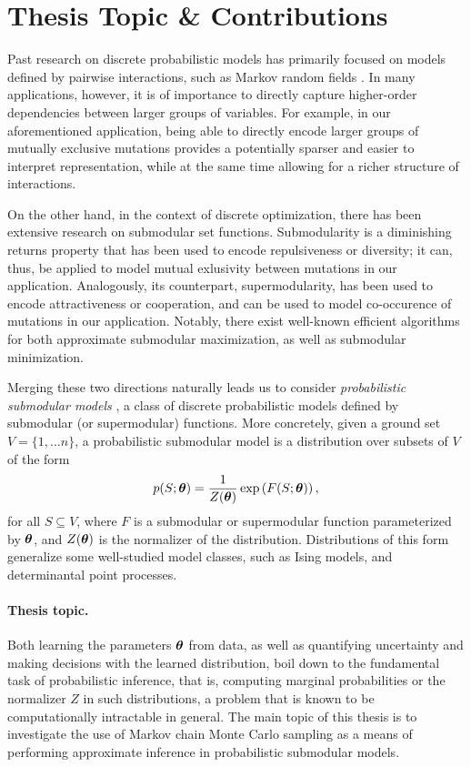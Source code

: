 \section{Thesis Topic \& Contributions}
Past research on discrete probabilistic models has primarily focused on models defined by pairwise interactions, such as Markov random fields \cite{koller09}.
In many applications, however, it is of importance to directly capture higher-order dependencies between larger groups of variables.
For example, in our aforementioned application, being able to directly encode larger groups of mutually exclusive mutations provides a potentially sparser and easier to interpret representation, while at the same time allowing for a richer structure of interactions.

On the other hand, in the context of discrete optimization, there has been extensive research on submodular set functions.
Submodularity is a diminishing returns property that has been used to encode repulsiveness or diversity; it can, thus, be applied to model mutual exlusivity between mutations in our application.
Analogously, its counterpart, supermodularity, has been used to encode attractiveness or cooperation, and can be used to model co-occurence of mutations in our application.
Notably, there exist well-known efficient algorithms for both approximate submodular maximization, as well as submodular minimization.

Merging these two directions naturally leads us to consider \emph{probabilistic submodular models} \citep{djolonga14,gotovos15}, a class of discrete probabilistic models defined by submodular (or supermodular) functions.
More concretely, given a ground set $V = \{1,\ldots n\}$, a probabilistic submodular model is a distribution over subsets of $V$ of the form
\begin{align*}
p(S; \bm{\theta}) = \frac{1}{Z(\bm{\theta})} \exp\left( F(S; \bm{\theta}) \right),
\end{align*}
for all $S \subseteq V$, where $F$ is a submodular or supermodular function parameterized by $\bm{\theta}$, and $Z(\bm{\theta})$ is the normalizer of the distribution.
Distributions of this form generalize some well-studied model classes, such as Ising models, and determinantal point processes.

\paragraph{Thesis topic.} Both learning the parameters $\bm{\theta}$ from data, as well as quantifying uncertainty and making decisions with the learned distribution, boil down to the fundamental task of probabilistic inference, that is, computing marginal probabilities or the normalizer $Z$ in such distributions, a problem that is known to be computationally intractable in general.
The main topic of this thesis is to investigate the use of Markov chain Monte Carlo sampling as a means of performing approximate inference in probabilistic submodular models.

